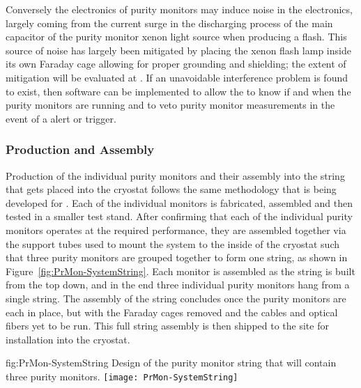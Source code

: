 Conversely the electronics of purity monitors may induce noise in the  electronics, largely coming from the current surge in the discharging process of the main capacitor of the purity monitor xenon light source when producing a flash.  This source of noise has largely been mitigated by placing the xenon flash lamp inside its own Faraday cage allowing for proper grounding and shielding; the extent of mitigation will be evaluated at .
If an unavoidable interference problem is found to exist, then software can be implemented to allow the  to know if and when the purity monitors are running and to veto purity monitor measurements in the event of a  alert or trigger. 


\subsubsection{Production and Assembly}
\label{sec:PrMon-Production-Assembly}
Production of the individual purity monitors and their assembly into the string that gets placed into the  cryostat follows the same methodology that is being developed for .  Each of the individual monitors is fabricated, assembled and then tested in a smaller test stand.  After confirming that each of the individual purity monitors operates at the required performance, they are assembled together via the support tubes used to mount the system to the inside of the cryostat such that three purity monitors are grouped together to form one string, as shown in Figure~\ref{fig:PrMon-SystemString}.
Each monitor is assembled as the string is built from the top down, and in the end %
three individual purity monitors %
hang from a single string.  The assembly of the string concludes once the purity monitors are each in place, but with the Faraday cages removed and the  cables and optical fibers yet to be run.  This full string assembly is then %
shipped to the  site for installation into the cryostat.

\begin{dunefigure}{fig:PrMon-SystemString}
  {Design of the purity monitor string that will contain three purity monitors.}
  \texttt{[image: PrMon-SystemString]}
\end{dunefigure}





